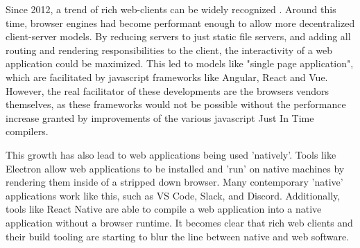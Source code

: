 


Since 2012, a trend of rich web-clients can be widely recognized \cite{hamilton_client-side_2014, panidi_hybrid_2015, kulawiak_analysis_2019}.
Around this time, browser engines had become performant enough to allow more decentralized client-server models.
By reducing servers to just static file servers, and adding all routing and rendering responsibilities to the client, the interactivity of a web application could be maximized. 
This led to models like "single page application", which are facilitated by javascript frameworks like Angular, React and Vue.
However, the real facilitator of these developments are the browsers vendors themselves, as these frameworks would not be possible without the performance increase granted by improvements of the various javascript Just In Time compilers. 

This growth has also lead to web applications being used 'natively'. 
Tools like Electron \citep{contributors_electron_2022} allow web applications to be installed and 'run' on native machines by rendering them inside of a stripped down browser. 
Many contemporary 'native' applications work like this, such as VS Code, Slack, and Discord.
Additionally, tools like React Native \citep{contributors_react_2022} are able to compile a web application into a native application without a browser runtime.  
It becomes clear that rich web clients and their build tooling are starting to blur the line between native and web software.

